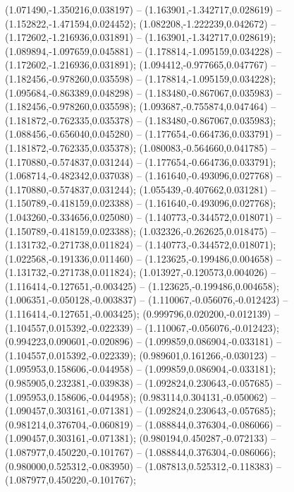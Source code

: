  (1.071490,-1.350216,0.038197) -- (1.163901,-1.342717,0.028619) -- (1.152822,-1.471594,0.024452);
 (1.082208,-1.222239,0.042672) -- (1.172602,-1.216936,0.031891) -- (1.163901,-1.342717,0.028619);
 (1.089894,-1.097659,0.045881) -- (1.178814,-1.095159,0.034228) -- (1.172602,-1.216936,0.031891);
 (1.094412,-0.977665,0.047767) -- (1.182456,-0.978260,0.035598) -- (1.178814,-1.095159,0.034228);
 (1.095684,-0.863389,0.048298) -- (1.183480,-0.867067,0.035983) -- (1.182456,-0.978260,0.035598);
 (1.093687,-0.755874,0.047464) -- (1.181872,-0.762335,0.035378) -- (1.183480,-0.867067,0.035983);
 (1.088456,-0.656040,0.045280) -- (1.177654,-0.664736,0.033791) -- (1.181872,-0.762335,0.035378);
 (1.080083,-0.564660,0.041785) -- (1.170880,-0.574837,0.031244) -- (1.177654,-0.664736,0.033791);
 (1.068714,-0.482342,0.037038) -- (1.161640,-0.493096,0.027768) -- (1.170880,-0.574837,0.031244);
 (1.055439,-0.407662,0.031281) -- (1.150789,-0.418159,0.023388) -- (1.161640,-0.493096,0.027768);
 (1.043260,-0.334656,0.025080) -- (1.140773,-0.344572,0.018071) -- (1.150789,-0.418159,0.023388);
 (1.032326,-0.262625,0.018475) -- (1.131732,-0.271738,0.011824) -- (1.140773,-0.344572,0.018071);
 (1.022568,-0.191336,0.011460) -- (1.123625,-0.199486,0.004658) -- (1.131732,-0.271738,0.011824);
 (1.013927,-0.120573,0.004026) -- (1.116414,-0.127651,-0.003425) -- (1.123625,-0.199486,0.004658);
 (1.006351,-0.050128,-0.003837) -- (1.110067,-0.056076,-0.012423) -- (1.116414,-0.127651,-0.003425);
 (0.999796,0.020200,-0.012139) -- (1.104557,0.015392,-0.022339) -- (1.110067,-0.056076,-0.012423);
 (0.994223,0.090601,-0.020896) -- (1.099859,0.086904,-0.033181) -- (1.104557,0.015392,-0.022339);
 (0.989601,0.161266,-0.030123) -- (1.095953,0.158606,-0.044958) -- (1.099859,0.086904,-0.033181);
 (0.985905,0.232381,-0.039838) -- (1.092824,0.230643,-0.057685) -- (1.095953,0.158606,-0.044958);
 (0.983114,0.304131,-0.050062) -- (1.090457,0.303161,-0.071381) -- (1.092824,0.230643,-0.057685);
 (0.981214,0.376704,-0.060819) -- (1.088844,0.376304,-0.086066) -- (1.090457,0.303161,-0.071381);
 (0.980194,0.450287,-0.072133) -- (1.087977,0.450220,-0.101767) -- (1.088844,0.376304,-0.086066);
 (0.980000,0.525312,-0.083950) -- (1.087813,0.525312,-0.118383) -- (1.087977,0.450220,-0.101767);
